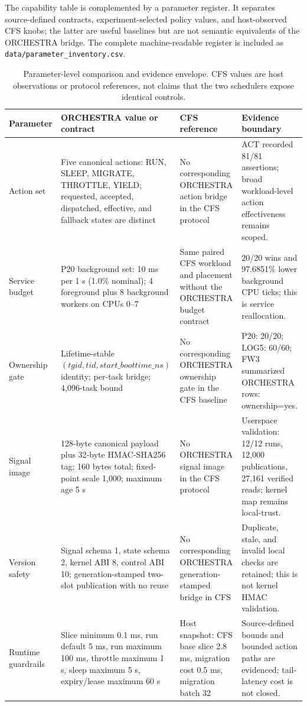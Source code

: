 \documentclass[10pt,letterpaper,twocolumn]{article}
\begin{document}
The capability table is complemented by a parameter register. It separates
source-defined contracts, experiment-selected policy values, and host-observed
CFS knobs; the latter are useful baselines but are not semantic equivalents of
the ORCHESTRA bridge. The complete machine-readable register is included as
\texttt{data/parameter\_inventory.csv}.

\begin{table}[t]
\centering\scriptsize
\caption{Parameter-level comparison and evidence envelope. CFS values are host observations or protocol references, not claims that the two schedulers expose identical controls.}
\label{tab:parameters}
\begin{tabularx}{\textwidth}{p{}p{}p{}Y}
\toprule
Parameter & ORCHESTRA value or contract & CFS reference & Evidence boundary \\
\midrule
Action set & Five canonical actions: RUN, SLEEP, MIGRATE, THROTTLE, YIELD; requested, accepted, dispatched, effective, and fallback states are distinct & No corresponding ORCHESTRA action bridge in the CFS protocol & ACT recorded 81/81 assertions; broad workload-level action effectiveness remains scoped. \\
Service budget & P20 background set: 10 ms per 1 s (1.0\% nominal); 4 foreground plus 8 background workers on CPUs 0--7 & Same paired CFS workload and placement without the ORCHESTRA budget contract & 20/20 wins and 97.6851\% lower background CPU ticks; this is service reallocation. \\
Ownership gate & Lifetime-stable $(\mathit{tgid},\mathit{tid},\mathit{start\_boottime\_ns})$ identity; per-task bridge; 4,096-task bound & No corresponding ORCHESTRA ownership gate in the CFS baseline & P20: 20/20; LOG5: 60/60; FW3 summarized ORCHESTRA rows: ownership=yes. \\
Signal image & 128-byte canonical payload plus 32-byte HMAC-SHA256 tag; 160 bytes total; fixed-point scale 1,000; maximum age 5 s & No ORCHESTRA signal image in the CFS protocol & Userspace validation: 12/12 runs, 12,000 publications, 27,161 verified reads; kernel map remains local-trust. \\
Version safety & Signal schema 1, state schema 2, kernel ABI 8, control ABI 10; generation-stamped two-slot publication with no reuse & No corresponding ORCHESTRA generation-stamped bridge in CFS & Duplicate, stale, and invalid local checks are retained; this is not kernel HMAC validation. \\
Runtime guardrails & Slice minimum 0.1 ms, run default 5 ms, run maximum 100 ms, throttle maximum 1 s, sleep maximum 5 s, expiry/lease maximum 60 s & Host snapshot: CFS base slice 2.8 ms, migration cost 0.5 ms, migration batch 32 & Source-defined bounds and bounded action paths are evidenced; tail-latency cost is not closed. \\

\end{tabularx}
\end{table}
\end{document}
